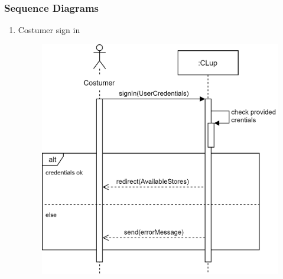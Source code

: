 \documentclass[]{article}
\begin{document}
			\subsubsection{Sequence Diagrams}
			
						\begin{enumerate}
							
							\item Costumer sign in
						\begin{figure}[H]
							\centering
							\includegraphics[scale=1.1]{login.png}
							\caption{}
							\label{fig:sign-in_sequencediagramm}
						\end{figure}
						\newpage
						

\end{enumerate}
\end{document}
